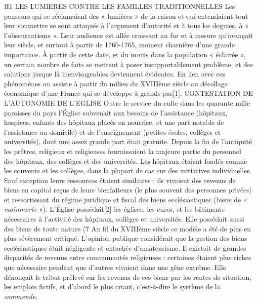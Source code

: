 H1 LES LUMIERES CONTRE LES FAMILLES TRADITIONNELLES 
 Les penseurs qui se réclamaient des « lumières » de la raison et qui entendaient tout leur soumettre se sont attaqués à l'argument d'autorité et à tous les dogmes, à « l'obscurantisme ». Leur audience est allée croissant au fur et à mesure qu'avançait leur siècle, et surtout à partir de 1760-1765, moment charnière d'une grande importance. À partir de cette date, et du moins dans la population « éclairée », un certain nombre de faits se mettent à poser insupportablement problème, et des solutions jusque là inenvisageables deviennent évidentes. En lien avec ces phénomènes on assiste à partir du milieu du XVIIIème siècle au décollage économique d'une France qui se développe à grands pas[1].
CONTESTATION DE L'AUTONOMIE DE L'EGLISE 
 Outre le service du culte dans les quarante mille paroisses du pays l'Église subvenait aux besoins de l'assistance (hôpitaux, hospices, enfants des hôpitaux placés en nourrice, et une part notable de l'assistance au domicile) et de l'enseignement (petites écoles, collèges et universités), dont une assez grande part était gratuite. Depuis la fin de l'antiquité les prêtres, religieux et religieuses fournissaient la majeure partie du personnel des hôpitaux, des collèges et des universités. Les hôpitaux étaient fondés comme les couvents et les collèges, dans la plupart de cas sur des initiatives individuelles. 
 Sauf exception leurs ressources étaient similaires : ils vivaient des revenus de biens en capital reçus de leurs bienfaiteurs (le plus souvent des personnes privées) et ressortissant du régime juridique et fiscal des biens ecclésiastiques (biens de \emph{« mainmorte} »). L'Église possédait[2] les églises, les cures, et les bâtiments nécessaires à l'activité des hôpitaux, collèges et universités. Elle possédait aussi des biens de toute nature (7 %
 Au fil du XVIIIème siècle ce modèle a été de plus en plus sévèrement critiqué. L'opinion publique considérait que la gestion des biens ecclésiastiques était négligente et entachée d'amateurisme. Il existait de grandes disparités de revenus entre communautés religieuses : certaines étaient plus riches que nécessaire pendant que d'autres vivaient dans une gêne extrême. Elle dénonçait le tribut prélevé sur les revenus de ces biens par les rentes de situation, les emplois fictifs, et d'abord le plus criant, c'est-à-dire le système de la \emph{commende}.
